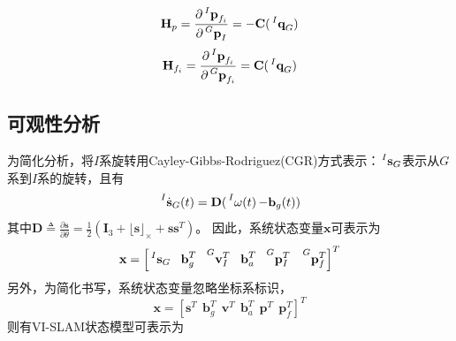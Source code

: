 \documentclass{article}
\begin{document}
\begin{equation}
    \textbf{H}_{p}=\frac{\partial\sideset{^I}{}{\mathop{\textbf{p}_{f_i}}}}{\partial\sideset{^G}{}{\mathop{\textbf{p}_I}}}
    =-\textbf{C}(\sideset{^I}{}{\mathop{\textbf{q}_G}})
\end{equation}
\begin{equation}
    \textbf{H}_{f_i}=\frac{\partial\sideset{^I}{}{\mathop{\textbf{p}_{f_i}}}}{\partial\sideset{^G}{}{\mathop{\textbf{p}_{f_i}}}}
    =\textbf{C}(\sideset{^I}{}{\mathop{\textbf{q}_G}})
\end{equation}

\subsection{可观性分析}
为简化分析，将$I$系旋转用Cayley-Gibbs-Rodriguez(CGR)方式表示：$\sideset{^I}{}{\mathop{\textbf{s}_{G}}}$表示从$G$系到$I$系的旋转，且有
\begin{equation}
    \sideset{^I}{}{\mathop{\dot{\textbf{s}}_{G}(t)}}=\textbf{D}(\sideset{^I}{}{\mathop{\mathbf{\omega}(t)}}-\textbf{b}_{g}(t))
\end{equation}
其中$\textbf{D}\triangleq \frac{\partial\textbf{s}}{\partial\theta}=\frac{1}{2}(\textbf{I}_{3}+\lfloor\textbf{s}\rfloor_{\times}+\textbf{s}\textbf{s}^T)$。
因此，系统状态变量$\textbf{x}$可表示为
\begin{equation}
    \textbf{x}=\left[\sideset{^I}{}{\mathop{\textbf{s}_{G}}}\ \ \textbf{b}_{g}^{T}
    \ \ \sideset{^G}{}{\mathop{\textbf{v}_{I}^{T}}}\ \ \textbf{b}_{a}^{T}\ \ \sideset{^G}{}{\mathop{\textbf{p}_{I}^{T}}}
    \ \ \sideset{^G}{}{\mathop{\textbf{p}_{f}^{T}}}\right]^T
\end{equation}
另外，为简化书写，系统状态变量忽略坐标系标识，
\begin{equation}
    \textbf{x}=\left[\textbf{s}^T\ \ \textbf{b}_{g}^{T}\ \ \textbf{v}^{T}\ \ \textbf{b}_{a}^{T}
    \ \ \textbf{p}^{T}\ \ \textbf{p}_{f}^{T}\right]^T
\end{equation}
则有VI-SLAM状态模型可表示为
\end{document}
